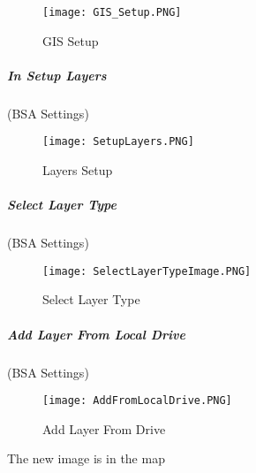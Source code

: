 \documentclass[class=article , crop=false, titlepage, twoside, multi={itemize, figure, verbatim}, float=false]{standalone}
\begin{document}
%
%
\begin{figure}[h!]
\centering
    \texttt{[image: GIS\_Setup.PNG]}
\caption{GIS Setup}
\end{figure}
\clearpage
%
%
%
\subparagraph[Layers Setup ]{\Large In Setup Layers\texorpdfstring{\\}{}}
(BSA Settings)
\vspace{.75in}


\vspace{.5in}
%
%
\begin{figure}[h!]
\centering
    \texttt{[image: SetupLayers.PNG]}
\caption{Layers Setup}
\end{figure}
\clearpage
%
%
%
\subparagraph[Select Layer Type ]{\Large Select Layer Type\texorpdfstring{\\}{}}
(BSA Settings)
\vspace{.75in}

\vspace{.5in}
%
%
\begin{figure}[h!]
\centering
    \texttt{[image: SelectLayerTypeImage.PNG]}
\caption{Select Layer Type}
\end{figure}
\clearpage
%
%
%
\subparagraph[Add Layer From Local Drive]{\Large Add Layer From Local Drive\texorpdfstring{\\}{}}
(BSA Settings)
\vspace{.75in}

\vspace{.5in}

%
%
\begin{figure}[h!]
\centering
    \texttt{[image: AddFromLocalDrive.PNG]}
\caption{Add Layer From Drive}
\end{figure}
{\Large The new image is in the map}
\clearpage
\end{document}
